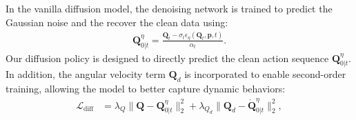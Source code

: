 \documentclass{article}
\begin{document}
In the vanilla diffusion model\cite{dhariwal2021diffusion}, the denoising network is trained to predict the Gaussian noise and the recover the clean data using:
\begin{equation}
    \begin{aligned}
      \bm{Q}^\eta_{0|t}= \frac{\bm{Q}_t - \sigma_t\epsilon_\eta(\bm{Q}_t, \bm{p}, t)}{\alpha_t} .
    \end{aligned}	
    \label{eq: c-ddpm-reserved}
\end{equation}
Our diffusion policy is designed to directly predict the clean action sequence $\bm{Q}^\eta_{0|t}$. In addition, the angular velocity term $\bm{Q}_d$ is incorporated to enable second-order training, allowing the model to better capture dynamic behaviors:
\begin{equation}
    \begin{aligned}
    \mathcal{L}_{\text{diff}}&= \lambda_{Q}\|\bm{Q} -\bm{Q}^\eta_{0|t}\|_2^2 + \lambda_{Q_d}\|\bm{Q}_d -\dot{\bm{Q}}^\eta_{0|t}\|_2^2 ,\\
    \end{aligned}
\end{equation}

\end{document}
